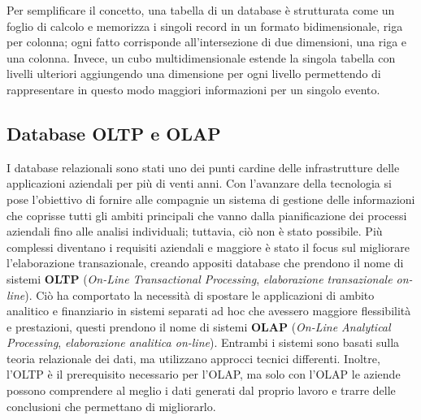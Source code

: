 Per semplificare il concetto, una tabella di un database è strutturata come un foglio di calcolo e memorizza i singoli record in un formato bidimensionale, riga per colonna; ogni fatto corrisponde all'intersezione di due dimensioni, una riga e una colonna. Invece, un cubo multidimensionale estende la singola tabella con livelli ulteriori aggiungendo una dimensione per ogni livello permettendo di rappresentare in questo modo maggiori informazioni per un singolo evento.\cite{ibm_multidimensional_data}

\subsection{Database OLTP e OLAP}

I database relazionali sono stati uno dei punti cardine delle infrastrutture delle applicazioni aziendali per più di venti anni. Con l'avanzare della tecnologia si pose l'obiettivo di fornire alle compagnie un sistema di gestione delle informazioni che coprisse tutti gli ambiti principali che vanno dalla pianificazione dei processi aziendali fino alle analisi individuali; tuttavia, ciò non è stato possibile. Più complessi diventano i requisiti aziendali e maggiore è stato il focus sul migliorare l'elaborazione transazionale, creando appositi database che prendono il nome di sistemi \textbf{OLTP} (\textit{On-Line Transactional Processing}, \textit{elaborazione transazionale on-line}). Ciò ha comportato la necessità di spostare le applicazioni di ambito analitico e finanziario in sistemi separati ad hoc che avessero maggiore flessibilità e prestazioni, questi prendono il nome di sistemi \textbf{OLAP} (\textit{On-Line Analytical Processing}, \textit{elaborazione analitica on-line}). Entrambi i sistemi sono basati sulla teoria relazionale dei dati, ma utilizzano approcci tecnici differenti. Inoltre, l'OLTP è il prerequisito necessario per l'OLAP, ma solo con l'OLAP le aziende possono comprendere al meglio i dati generati dal proprio lavoro e trarre delle conclusioni che permettano di migliorarlo.\cite{scribd_oltp_olap}


